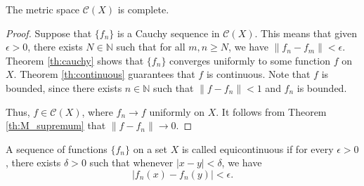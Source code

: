 \documentclass[11pt]{article}
\def\N{\mathbb{N}}
\newcommand\norm[1]{\left\lVert#1\right\rVert}
\theoremstyle{definition}
\theoremstyle{remark}
\numberwithin{equation}{module}
\begin{document}
    \begin{theorem}
        The metric space $\mathscr{C}(X)$ is complete.
    \end{theorem}
    \begin{proof}
        Suppose that $\{f_n\}$ is a Cauchy sequence in $\mathscr{C}(X)$. This means
        that given $\epsilon > 0$, there exists $N \in \N$ such that for all $m, n
        \geq N$, we have $\norm{f_n - f_m} < \epsilon$. Theorem \ref{th:cauchy}
        shows that $\{f_n\}$ converges uniformly to some function $f$ on $X$.
        Theorem \ref{th:continuous} guarantees that $f$ is continuous.
        Note that $f$ is bounded, since there exists $n \in \N$ such that $\norm{f -
        f_n} < 1$ and $f_n$ is bounded.

        Thus, $f \in \mathscr{C}(X)$, where $f_n \to f$ uniformly on $X$. It follows
        from Theorem \ref{th:M_supremum} that $\norm{f - f_n} \to 0$.
    \end{proof}

    \begin{definition}[Equicontinuity]
        A sequence of functions $\{f_n\}$ on a set $X$ is called equicontinuous if
        for every $\epsilon > 0$, there exists $\delta > 0$ such that whenever $|x -
        y| < \delta$, we have \[
            |f_n(x) - f_n(y)| < \epsilon.
        \] 
    \end{definition}
    
\end{document}
